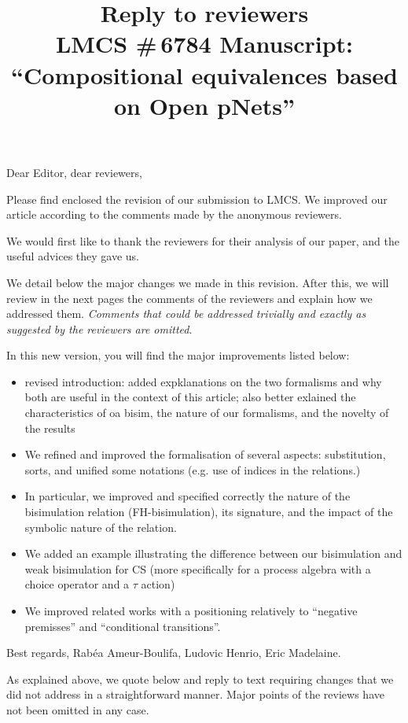 \documentclass{article}
\title{Reply to reviewers\\
LMCS \#\,6784 Manuscript: \\``Compositional equivalences based on Open pNets'' }
\begin{document}
\maketitle
\noindent
Dear Editor, dear reviewers,

Please find enclosed the revision of our submission to LMCS. We improved our article according to the comments made by the
anonymous reviewers.

We would first like to thank the reviewers for their analysis of our
paper, and the useful advices they gave us.

We detail below the major changes we made in this revision. After
this, we will review in the next pages the comments of the reviewers
and explain how we addressed them.  \emph{Comments that could be
  addressed trivially and exactly as suggested by the reviewers are
  omitted}.  \bigskip

In this new version, you will find the major improvements listed below:
\begin{itemize}
\item revised introduction: added expklanations on the two formalisms and why both are useful in the context of this article; also better exlained the characteristics of oa bisim, the nature of our formalisms, and the novelty of the results
\item We refined and improved the formalisation of several aspects: substitution, sorts,  and unified some notations (e.g. use of indices in the relations.)
\item In particular, we improved and specified correctly the nature of the bisimulation relation (FH-bisimulation), its signature, and the impact of the symbolic nature of the relation.
\item We added an example illustrating the difference between our bisimulation and weak bisimulation for CS (more specifically for a process algebra with a choice operator and a $\tau$ action)
\item We improved related works with a positioning relatively to ``negative premisses'' and ``conditional transitions''.
\end{itemize}

\bigskip
\noindent
Best regards,
\newline
\noindent
Rab\'ea Ameur-Boulifa, Ludovic Henrio, Eric Madelaine.

\newpage
As explained above, we quote below and reply to text requiring changes that we did not 
address in a straightforward manner. Major points of the reviews have not been omitted in 
any case.
\end{document}
